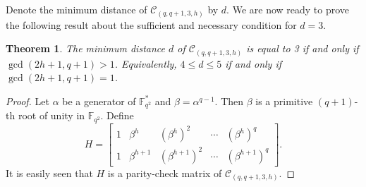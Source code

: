 \documentclass[10pt]{article}%
\newtheorem{theorem}{Theorem}%
\begin{document}
	Denote the minimum distance of $\mathcal{C}_{(q,q+1,3,h)}$ by $d$. We are now ready to prove the following result about the sufficient and necessary condition for $d=3$.
	\begin{theorem}\label{sec3 thm1}
		The minimum distance $d$ of $\mathcal{C}_{(q,q+1,3,h)}$ is equal to 3 if and only if $\gcd(2h+1,q+1)>1$. Equivalently, $4 \le d \le 5$ if and only if $\gcd(2h+1,q+1)=1$.
	\end{theorem}
	\begin{proof}
		Let $\alpha$ be a generator of $\mathbb{F}_{q^2}^{\ast}$ and $\beta=\alpha^{q-1}$. Then $\beta$ is a primitive $(q+1)$-th root of unity in $\mathbb{F}_{q^2}$. Define
		\begin{equation*}
			\left.H=\left[\begin{array}{lllll}1&\beta^{h}&(\beta^{h})^2&\cdots&(\beta^{h})^q\\1&\beta^{h+1}&(\beta^{h+1})^2&\cdots&(\beta^{h+1})^q\end{array}\right.\right].
		\end{equation*}
		It is easily seen that $H$ is a parity-check matrix of $\mathcal{C}_{(q,q+1,3,h)}$.
		

\end{proof}
\end{document}
